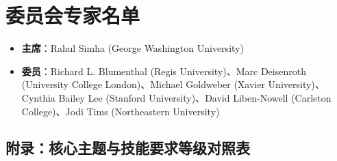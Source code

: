 \section{委员会专家名单}
\begin{itemize}
    \item \textbf{主席}：Rahul Simha (George Washington University)
    \item \textbf{委员}：Richard L. Blumenthal (Regis University)、Marc Deisenroth (University College London)、Michael Goldweber (Xavier University)、Cynthia Bailey Lee (Stanford University)、David Liben-Nowell (Carleton College)、Jodi Tims (Northeastern University)
\end{itemize}

\begin{strip}
\section{附录：核心主题与技能要求等级对照表}


\end{strip}
